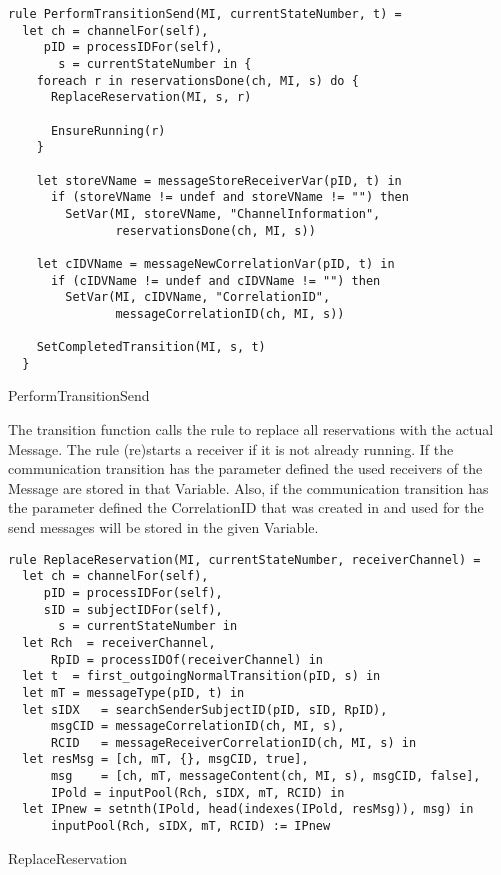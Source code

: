 \begin{listing}[H]
\begin{verbatim}
rule PerformTransitionSend(MI, currentStateNumber, t) =
  let ch = channelFor(self),
     pID = processIDFor(self),
       s = currentStateNumber in {
    foreach r in reservationsDone(ch, MI, s) do {
      ReplaceReservation(MI, s, r)

      EnsureRunning(r)
    }

    let storeVName = messageStoreReceiverVar(pID, t) in
      if (storeVName != undef and storeVName != "") then
        SetVar(MI, storeVName, "ChannelInformation",
               reservationsDone(ch, MI, s))

    let cIDVName = messageNewCorrelationVar(pID, t) in
      if (cIDVName != undef and cIDVName != "") then
        SetVar(MI, cIDVName, "CorrelationID",
               messageCorrelationID(ch, MI, s))

    SetCompletedTransition(MI, s, t)
  }
\end{verbatim}
\caption{PerformTransitionSend}
\label{lst:shortasm:PerformTransitionSend}
\end{listing}


The transition function calls the  rule to replace all
reservations with the actual Message. The  rule
(re)starts a receiver if it is not already running.
If the communication transition has the parameter  defined
the used receivers of the Message are stored in that Variable.
Also, if the communication transition has the parameter  defined
the CorrelationID that was created in  and used for the send messages will be stored in the given Variable.


\begin{listing}[H]
\begin{verbatim}
rule ReplaceReservation(MI, currentStateNumber, receiverChannel) =
  let ch = channelFor(self),
     pID = processIDFor(self),
     sID = subjectIDFor(self),
       s = currentStateNumber in
  let Rch  = receiverChannel,
      RpID = processIDOf(receiverChannel) in
  let t  = first_outgoingNormalTransition(pID, s) in
  let mT = messageType(pID, t) in
  let sIDX   = searchSenderSubjectID(pID, sID, RpID),
      msgCID = messageCorrelationID(ch, MI, s),
      RCID   = messageReceiverCorrelationID(ch, MI, s) in
  let resMsg = [ch, mT, {}, msgCID, true],
      msg    = [ch, mT, messageContent(ch, MI, s), msgCID, false],
      IPold = inputPool(Rch, sIDX, mT, RCID) in
  let IPnew = setnth(IPold, head(indexes(IPold, resMsg)), msg) in
      inputPool(Rch, sIDX, mT, RCID) := IPnew
\end{verbatim}
\caption{ReplaceReservation}
\label{lst:shortasm:ReplaceReservation}
\end{listing}


